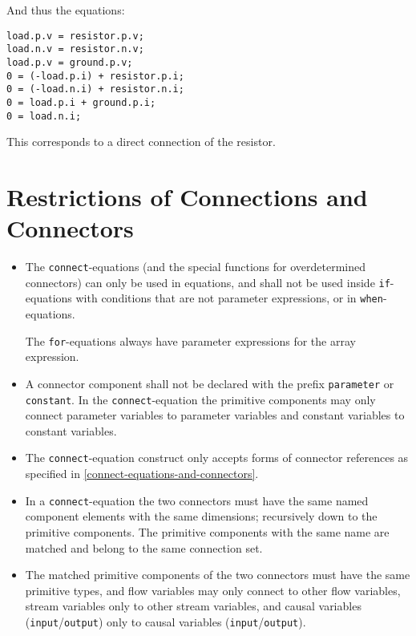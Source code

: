 \begin{example}
And thus the equations:
\begin{lstlisting}[language=modelica]
load.p.v = resistor.p.v;
load.n.v = resistor.n.v;
load.p.v = ground.p.v;
0 = (-load.p.i) + resistor.p.i;
0 = (-load.n.i) + resistor.n.i;
0 = load.p.i + ground.p.i;
0 = load.n.i;
\end{lstlisting}

This corresponds to a direct connection of the resistor.
\end{example}

\section{Restrictions of Connections and Connectors}\label{restrictions-of-connections-and-connectors}

\begin{itemize}
\item
  The \lstinline!connect!-equations (and the special functions for overdetermined connectors) can only be used in equations, and shall not be used inside \lstinline!if!-equations with conditions that are not parameter expressions, or in \lstinline!when!-equations.
  \begin{nonnormative}
  The \lstinline!for!-equations always have parameter expressions for the array expression.
  \end{nonnormative}
\item
  A connector component shall not be declared with the prefix \lstinline!parameter! or \lstinline!constant!.
  In the \lstinline!connect!-equation the primitive components may only connect parameter variables to parameter variables and constant variables to constant variables.
\item
  The \lstinline!connect!-equation construct only accepts forms of connector references as specified in \cref{connect-equations-and-connectors}.
\item
  In a \lstinline!connect!-equation the two connectors must have the same named component elements with the same dimensions; recursively down to the primitive components.
  The primitive components with the same name are matched and belong to the same connection set.
\item
  The matched primitive components of the two connectors must have the same primitive types, and flow variables may only connect to other flow variables, stream variables only to other stream variables, and causal variables (\lstinline!input!/\lstinline!output!) only to causal variables (\lstinline!input!/\lstinline!output!).

\end{itemize}

